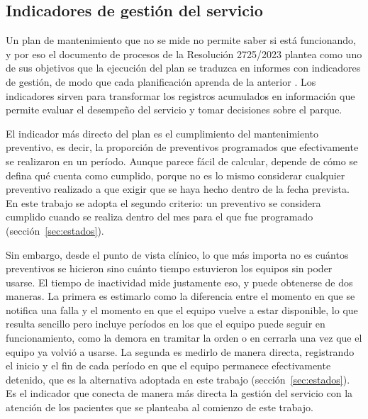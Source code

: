 \documentclass[10pt]{article}
\begin{document}
\subsection{Indicadores de gestión del servicio}
\label{sec:indicadores-gestion}
Un plan de mantenimiento que no se mide no permite saber si está funcionando, y por eso el documento de procesos de la Resolución 2725/2023 plantea como uno de sus objetivos que la ejecución del plan se traduzca en informes con indicadores de gestión, de modo que cada planificación aprenda de la anterior \cite{res_2725_2023}. Los indicadores sirven para transformar los registros acumulados en información que permite evaluar el desempeño del servicio y tomar decisiones sobre el parque.

El indicador más directo del plan es el cumplimiento del mantenimiento preventivo, es decir, la proporción de preventivos programados que efectivamente se realizaron en un período. Aunque parece fácil de calcular, depende de cómo se defina qué cuenta como cumplido, porque no es lo mismo considerar cualquier preventivo realizado a que exigir que se haya hecho dentro de la fecha prevista. En este trabajo se adopta el segundo criterio: un preventivo se considera cumplido cuando se realiza dentro del mes para el que fue programado (sección~\ref{sec:estados}).

Sin embargo, desde el punto de vista clínico, lo que más importa no es cuántos preventivos se hicieron sino cuánto tiempo estuvieron los equipos sin poder usarse. El tiempo de inactividad mide justamente eso, y puede obtenerse de dos maneras. La primera es estimarlo como la diferencia entre el momento en que se notifica una falla y el momento en que el equipo vuelve a estar disponible, lo que resulta sencillo pero incluye períodos en los que el equipo puede seguir en funcionamiento, como la demora en tramitar la orden o en cerrarla una vez que el equipo ya volvió a usarse. La segunda es medirlo de manera directa, registrando el inicio y el fin de cada período en que el equipo permanece efectivamente detenido, que es la alternativa adoptada en este trabajo (sección~\ref{sec:estados}). Es el indicador que conecta de manera más directa la gestión del servicio con la atención de los pacientes que se planteaba al comienzo de este trabajo.
\end{document}
